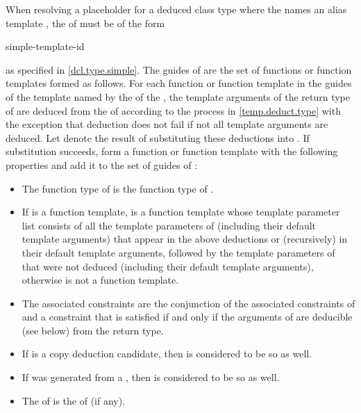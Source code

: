 \pnum
When resolving a placeholder for a deduced class type
where the  names an alias template ,
the  of  must be of the form
\begin{ncsimplebnf}
   simple-template-id
\end{ncsimplebnf}
as specified in \ref{dcl.type.simple}.
The guides of  are the set of functions or function templates
formed as follows.
For each function or function template  in the guides of
the template named by the 
of the ,
the template arguments of the return type of 
are deduced
from the  of 
according to the process in \ref{temp.deduct.type}
with the exception that deduction does not fail
if not all template arguments are deduced.
Let  denote the result of substituting
these deductions into .
If substitution succeeds,
form a function or function template 
with the following properties and add it to the set
of guides of :
\begin{itemize}
\item
The function type of  is the function type of .

\item
If  is a function template,
 is a function template whose
template parameter list consists of
all the template parameters of 
(including their default template arguments)
that appear in the above deductions or
(recursively) in their default template arguments,
followed by the template parameters of  that were not deduced
(including their default template arguments),
otherwise  is not a function template.

\item
The associated constraints are
the conjunction of the associated constraints of  and
a constraint that is satisfied if and only if
the arguments of  are deducible (see below) from the return type.

\item
If  is a copy deduction candidate,
then  is considered to be so as well.

\item
If  was generated
from a ,
then  is considered to be so as well.

\item
The  of  is
the  of  (if any).
\end{itemize}

